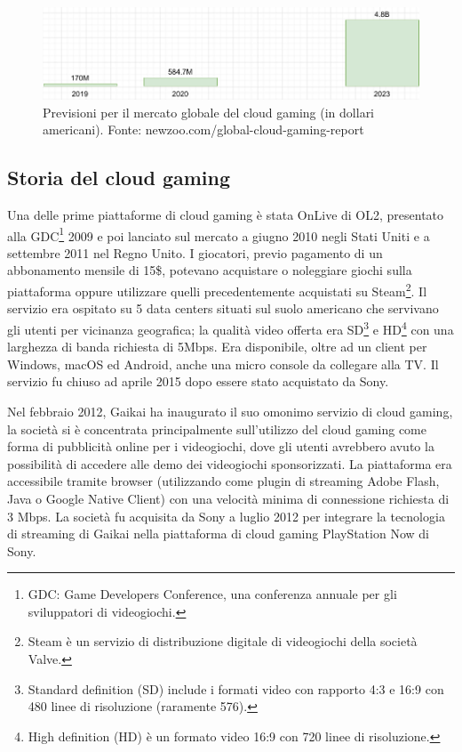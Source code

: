 \begin{figure}[H]
	\includegraphics[width=\linewidth]{immagini/Newzoo_Cloud_Gaming_Revenues}
	\caption{Previsioni per il mercato globale del cloud gaming (in dollari americani). Fonte: newzoo.com/global-cloud-gaming-report}
	\label{fig:Newzoo_Cloud_Gaming_Revenues}
\end{figure}

\subsection{Storia del cloud gaming} \label{StoriaDelCloudGaming}
Una delle prime piattaforme di cloud gaming è stata OnLive di OL2, presentato alla GDC\footnote{GDC: Game Developers Conference, una conferenza annuale per gli sviluppatori di videogiochi.} 2009 e poi lanciato sul mercato a giugno 2010 negli Stati Uniti e a settembre 2011 nel Regno Unito. I giocatori, previo pagamento di un abbonamento mensile di 15\$, potevano acquistare o noleggiare giochi sulla piattaforma oppure utilizzare quelli precedentemente acquistati su Steam\footnote{Steam è un servizio di distribuzione digitale di videogiochi della società Valve.}. Il servizio era ospitato su 5 data centers situati sul suolo americano che servivano gli utenti per vicinanza geografica; la qualità video offerta era SD\footnote{Standard definition (SD) include i formati video con rapporto 4:3 e 16:9 con 480 linee di risoluzione (raramente 576).} e HD\footnote{High definition (HD) è un formato video 16:9 con 720 linee di risoluzione.} con una larghezza di banda richiesta di 5Mbps. Era disponibile, oltre ad un client per Windows, macOS ed Android, anche una micro console da collegare alla TV. Il servizio fu chiuso ad aprile 2015 dopo essere stato acquistato da Sony\cite{Cloud_gaming_history}.

Nel febbraio 2012, Gaikai ha inaugurato il suo omonimo servizio di cloud gaming, la società si è concentrata principalmente sull'utilizzo del cloud gaming come forma di pubblicità online per i videogiochi, dove gli utenti avrebbero avuto la possibilità di accedere alle demo dei videogiochi sponsorizzati. La piattaforma era accessibile tramite browser (utilizzando come plugin di streaming Adobe Flash, Java o Google Native Client) con una velocità minima di connessione richiesta di 3 Mbps. La società fu acquisita da Sony a luglio 2012 per integrare la tecnologia di streaming di Gaikai nella piattaforma di cloud gaming PlayStation Now di Sony.

